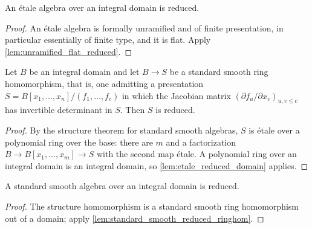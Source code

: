 \begin{lemma}
  \label{lem:etale_reduced_domain}
  \leanok
  An \'etale algebra over an integral domain is reduced.
\end{lemma}
\begin{proof}
  \leanok
  An \'etale algebra is formally unramified and of finite presentation, in particular
  essentially of finite type, and it is flat. Apply \ref{lem:unramified_flat_reduced}.
\end{proof}

\begin{lemma}
  \label{lem:standard_smooth_reduced_ringhom}
  \leanok
  Let \(B\) be an integral domain and let \(B \to S\) be a standard smooth ring homomorphism,
  that is, one admitting a presentation \(S = B[x_1,\dots,x_n]/(f_1,\dots,f_c)\) in which the
  Jacobian matrix \((\partial f_u/\partial x_v)_{u,v \le c}\) has invertible determinant in
  \(S\). Then \(S\) is reduced.
\end{lemma}
\begin{proof}
  \leanok
  By the structure theorem for standard smooth algebras, \(S\) is \'etale over a polynomial
  ring over the base: there are \(m\) and a factorization
  \(B \to B[x_1,\dots,x_m] \to S\) with the second map \'etale. A polynomial ring over an
  integral domain is an integral domain, so \ref{lem:etale_reduced_domain} applies.
\end{proof}

\begin{lemma}
  \label{lem:standard_smooth_reduced}
  \leanok
  A standard smooth algebra over an integral domain is reduced.
\end{lemma}
\begin{proof}
  \leanok
  The structure homomorphism is a standard smooth ring homomorphism out of a domain; apply
  \ref{lem:standard_smooth_reduced_ringhom}.
\end{proof}

